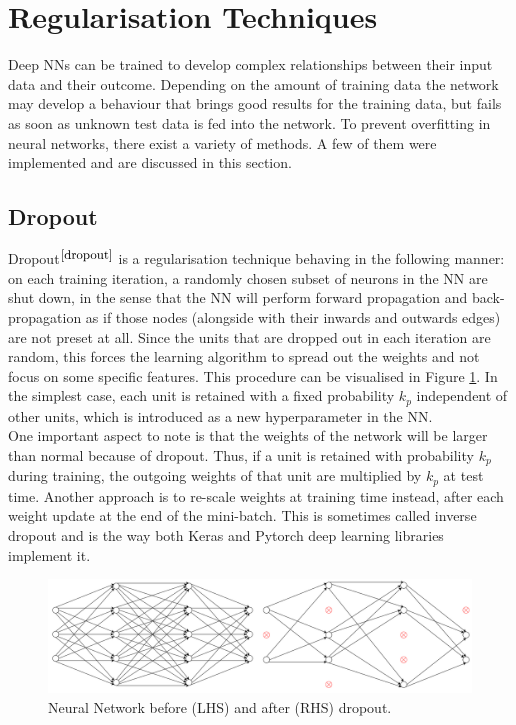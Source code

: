 \section{Regularisation Techniques}

Deep NNs can be trained to develop complex relationships between their input data and their outcome. Depending on the amount of training data the network may develop a behaviour that brings good results for the training data, but fails as soon as unknown test data is fed into the network. To prevent overfitting in neural networks, there exist a variety of methods. A few of them were implemented and are discussed in this section.

\subsection{Dropout}

Dropout$^{\small \cite{dropout}}$ is a regularisation technique behaving in the following manner: on each training iteration, a randomly chosen subset of neurons in the NN are shut down, in the sense that the NN will perform forward propagation and back-propagation as if those nodes (alongside with their inwards and outwards edges) are not preset at all. Since the units that are dropped out in each iteration are random, this forces the learning algorithm to spread out the weights and not focus on some specific features. This procedure can be visualised in Figure \ref{dropout}. In the simplest case, each unit is retained with a fixed probability $k_p$ independent of other units, which is introduced as a new hyperparameter in the NN. \\

One important aspect to note is that the weights of the network will be larger than normal because of dropout. Thus, if a unit is retained with probability $k_p$ during training, the outgoing weights of that unit are multiplied by $k_p$ at test
time. Another approach is to re-scale weights at training time instead, after each weight update at the end of the mini-batch. This is sometimes called inverse dropout and is the way both Keras and Pytorch deep learning libraries implement it. \\


\begin{figure}[H]
  \centering
  \includegraphics[scale = 0.4]{Images/dropout_new.png}

  \caption{Neural Network before (LHS) and after (RHS) dropout.}
  \label{dropout}
\end{figure}

